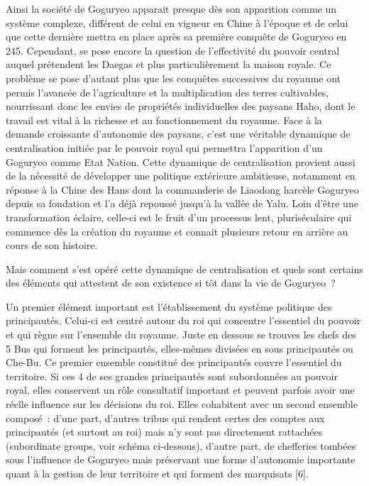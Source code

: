 \documentclass[11pt,a4paper]{article}
\begin{document}
Ainsi la société de Goguryeo apparait presque dès son apparition comme un système complexe, différent de celui en vigueur en Chine à l'époque et de celui que cette dernière mettra en place après sa première conquête de Goguryeo en 245. Cependant, se pose encore la question de l'effectivité du pouvoir central auquel prétendent les Daegas et plus particulièrement la maison royale. Ce problème se pose d'autant plus que les conquêtes successives du royaume ont permis l'avancée de l'agriculture et la multiplication des terres cultivables, nourrissant donc les envies de propriétés individuelles des paysans Haho, dont le travail est vital à la richesse et au fonctionnement du royaume. Face à la demande croissante d'autonomie des paysans, c'est une véritable dynamique de centralisation initiée par le pouvoir royal qui permettra l'apparition d'un Goguryeo comme Etat Nation. Cette dynamique de centralisation provient aussi de la nécessité de développer une politique extérieure ambitieuse, notamment en réponse à la Chine des Hans dont la commanderie de Liaodong harcèle Goguryeo depuis sa fondation et l'a déjà repoussé jusqu'à la vallée de Yalu. Loin d'être une transformation éclaire, celle-ci est le fruit d'un processus lent, pluriséculaire qui commence dès la création du royaume et connait plusieurs retour en arrière au cours de son histoire.

Mais comment s'est opéré cette dynamique de centralisation et quels sont certains des éléments qui attestent de son existence si tôt dans la vie de Goguryeo~?

Un premier élément important est l'établissement du système politique des principautés. Celui-ci est centré autour du roi qui concentre l'essentiel du pouvoir et qui règne sur l'ensemble du royaume. Juste en dessous se trouves les chefs des 5 Bus qui forment les principautés, elles-mêmes divisées en sous principautés ou Che-Bu. Ce premier ensemble constitué des principautés couvre l'essentiel du territoire. Si ces 4 de ses grandes principautés sont subordonnées au pouvoir royal, elles conservent un rôle consultatif important et peuvent parfois avoir une réelle influence sur les décisions du roi. Elles cohabitent avec un second ensemble composé~: d'une part, d'autres tribus qui rendent certes des comptes aux principautés (et surtout au roi) mais n'y sont pas directement rattachées (subordinate groups, voir schéma ci-dessous), d'autre part, de chefferies tombées sous l'influence de Goguryeo mais préservant une forme d'autonomie importante quant à la gestion de leur territoire et qui forment des marquisats {[}6{]}.
\end{document}
